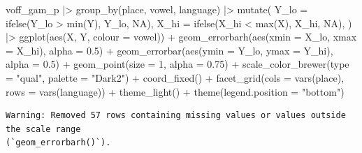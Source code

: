 \documentclass[
]{interact}
\newenvironment{Shaded}{\begin{snugshade}}{\end{snugshade}}
\newcommand{\AttributeTok}[1]{\textcolor[rgb]{0.40,0.45,0.13}{#1}}
\newcommand{\ConstantTok}[1]{\textcolor[rgb]{0.56,0.35,0.01}{#1}}
\newcommand{\DecValTok}[1]{\textcolor[rgb]{0.68,0.00,0.00}{#1}}
\newcommand{\FloatTok}[1]{\textcolor[rgb]{0.68,0.00,0.00}{#1}}
\newcommand{\FunctionTok}[1]{\textcolor[rgb]{0.28,0.35,0.67}{#1}}
\newcommand{\NormalTok}[1]{\textcolor[rgb]{0.00,0.23,0.31}{#1}}
\newcommand{\SpecialCharTok}[1]{\textcolor[rgb]{0.37,0.37,0.37}{#1}}
\newcommand{\StringTok}[1]{\textcolor[rgb]{0.13,0.47,0.30}{#1}}
\begin{document}
\label{cell-fig-voff-ci}
\begin{Shaded}
\begin{Highlighting}[]
\NormalTok{voff\_gam\_p }\SpecialCharTok{|\textgreater{}} 
  \FunctionTok{group\_by}\NormalTok{(place, vowel, language) }\SpecialCharTok{|\textgreater{}} 
  \FunctionTok{mutate}\NormalTok{(}
    \AttributeTok{Y\_lo =} \FunctionTok{ifelse}\NormalTok{(Y\_lo }\SpecialCharTok{\textgreater{}} \FunctionTok{min}\NormalTok{(Y), Y\_lo, }\ConstantTok{NA}\NormalTok{),}
    \AttributeTok{X\_hi =} \FunctionTok{ifelse}\NormalTok{(X\_hi }\SpecialCharTok{\textless{}} \FunctionTok{max}\NormalTok{(X), X\_hi, }\ConstantTok{NA}\NormalTok{),}
\NormalTok{  ) }\SpecialCharTok{|\textgreater{}} 
  \FunctionTok{ggplot}\NormalTok{(}\FunctionTok{aes}\NormalTok{(X, Y, }\AttributeTok{colour =}\NormalTok{ vowel)) }\SpecialCharTok{+}
  \FunctionTok{geom\_errorbarh}\NormalTok{(}\FunctionTok{aes}\NormalTok{(}\AttributeTok{xmin =}\NormalTok{ X\_lo, }\AttributeTok{xmax =}\NormalTok{ X\_hi), }\AttributeTok{alpha =} \FloatTok{0.5}\NormalTok{) }\SpecialCharTok{+}
  \FunctionTok{geom\_errorbar}\NormalTok{(}\FunctionTok{aes}\NormalTok{(}\AttributeTok{ymin =}\NormalTok{ Y\_lo, }\AttributeTok{ymax =}\NormalTok{ Y\_hi), }\AttributeTok{alpha =} \FloatTok{0.5}\NormalTok{) }\SpecialCharTok{+}
  \FunctionTok{geom\_point}\NormalTok{(}\AttributeTok{size =} \DecValTok{1}\NormalTok{, }\AttributeTok{alpha =} \FloatTok{0.75}\NormalTok{) }\SpecialCharTok{+}
  \FunctionTok{scale\_color\_brewer}\NormalTok{(}\AttributeTok{type =} \StringTok{"qual"}\NormalTok{, }\AttributeTok{palette =} \StringTok{"Dark2"}\NormalTok{) }\SpecialCharTok{+}
  \FunctionTok{coord\_fixed}\NormalTok{() }\SpecialCharTok{+}
  \FunctionTok{facet\_grid}\NormalTok{(}\AttributeTok{cols =} \FunctionTok{vars}\NormalTok{(place), }\AttributeTok{rows =} \FunctionTok{vars}\NormalTok{(language)) }\SpecialCharTok{+}
  \FunctionTok{theme\_light}\NormalTok{() }\SpecialCharTok{+}
  \FunctionTok{theme}\NormalTok{(}\AttributeTok{legend.position =} \StringTok{"bottom"}\NormalTok{)}
\end{Highlighting}
\end{Shaded}

\begin{verbatim}
Warning: Removed 57 rows containing missing values or values outside the scale range
(`geom_errorbarh()`).
\end{verbatim}
\end{document}
